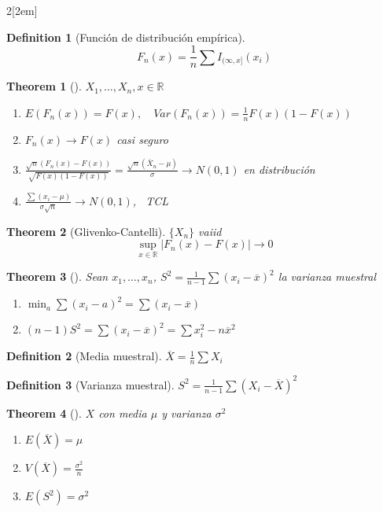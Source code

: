 \documentclass[leqno]{article}
\newtheorem*{theorem}{Theorem}
\newtheorem*{definition}{Definition}
\begin{document}
\begin{multicols}{2}[\columnsep2em]
\begin{definition}[Función de distribución empírica]
  \[
	F_n(x) = \frac{1}{n}\sum I_{(\infty, x]}(x_i)
  \] 
\end{definition}

\begin{theorem}[]$X_1, \ldots, X_n, x \in \mathbb{R}$
  \begin{enumerate}[topsep=-6pt, itemsep=0pt]
	\item $E(F_n(x))=F(x), \quad Var(F_n(x))= \frac{1}{n}F(x)(1-F(x))$
	\item $F_n(x) \to  F(x)$ casi seguro
	\item $\frac{\sqrt{n} (F_n(x)-F(x))}{\sqrt{F(x)(1-F(x))} } = \frac{\sqrt{n} (\bar{X}_n-\mu) }{\sigma } \to  N(0,1)$ en distribución
	\item $\frac{\sum (x_i -\mu)}{\sigma \sqrt{n}} \to N(0,1)$, \ TCL
  \end{enumerate}
\end{theorem}

\begin{theorem}[Glivenko-Cantelli] $\{X_n\}$ vaiid 
  \[
	\sup_{x\in \mathbb{R}} |F_n(x)-F(x)| \to 0
  \] 
\end{theorem}

\begin{theorem}[]
Sean $x_1, \ldots, x_n$,  $S^2 =\frac{1}{n-1}\sum (x_i-\overline{x}) ^2$ la varianza muestral
\begin{enumerate}[topsep=-6pt, itemsep=0pt]
  \item $\min_a \sum (x_i-a)^2 = \sum (x_i-\overline{x})$ 
  \item $(n-1)S^2 = \sum (x_i-\overline{x})^2 = \sum x_i^2-n\overline{x}^2$
\end{enumerate}
\end{theorem}

\begin{definition}[Media muestral]
$\overline{X} = \frac{1}{n}\sum X_i$
\end{definition}

\begin{definition}[Varianza muestral]
$S^2 = \frac{1}{n-1}\sum (X_i-\overline{X})^2$
\end{definition}

\begin{theorem}[] $X$ con media  $\mu$ y varianza $\sigma ^2$  
\begin{enumerate}[topsep=-6pt, itemsep=0pt]
  \item $E(\overline{X}) = \mu$
  \item $V(\overline{X}) = \frac{\sigma ^2}{n}$ 
  \item $E(S^2)=\sigma ^2$
\end{enumerate}
\end{theorem}


\end{multicols}
\end{document}

